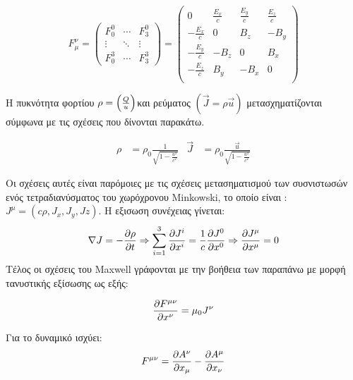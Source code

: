 \[
  F_\mu ^\nu=
  \begin{pmatrix}
    F^0 _0  & \cdots & F^0 _3 \\
    \vdots & \ddots & \vdots \\
    F^3 _0  & \cdots & F^3 _3
  \end{pmatrix}
  =
  \begin{pmatrix}
    0                &\frac{E_x}{c} &\frac{E_y}{c} & \frac{E_z}{c} \\
    -\frac{E_x}{c}   & 0            & B_z          & -B_y \\
    -\frac{E_y}{c}   & -B_z         & 0            & B_x \\
    -\frac{E_z}{c}   & B_y          & -B_x         & 0 \\
  \end{pmatrix} 
\]

Η πυκνότητα φορτίου $\rho = \left(  \frac{Q}{u} \right) $και ρεύματος $(\vec{J}=\rho \vec{u}) $ μετασχηματίζονται σύμφωνα με τις σχέσεις που δίνονται παρακάτω. 

\begin{align}
  \rho &=\rho_0\frac{1}{\sqrt{1-\frac{u^2}{c^2}}}  & \vec{J}& =\rho_0\frac{\vec{u}}{\sqrt{1-\frac{u^2}{c^2}}}
\end{align}

Οι σχέσεις αυτές είναι παρόμοιες με τις σχέσεις μετασηματισμού των συσνιστωσών ενός τετραδιανύσματος του χωρόχρονου Minkowski, το οποίο είναι : $J^{\mu}=(c\rho,J_x,J_y,Jz)$. 
Η εξισωση συνέχειας γίνεται: 
\begin{equation}
  \nabla J = -\frac{\partial \rho}{\partial t} \Rightarrow \sum\limits_{i=1}^3 \frac{\partial J^i}{\partial x^i}=\frac{1}{c}\frac{\partial J^0}{\partial x^0} \Rightarrow \frac{\partial J^{\mu}}{\partial x^{\mu}}=0
  \label{contineq}
\end{equation}
Τέλος οι σχέσεις του \textlatin{Maxwell} γράφονται με την βοήθεια των παραπάνω με μορφή τανυστικής εξίσωσης ως εξής: 

\begin{equation}
  \frac{\partial F^{\mu \nu}}{\partial x^{\nu}}=\mu_0 J^{\nu}
  \label {contineq2}
\end{equation}

Για το δυναμικό ισχύει: 
\[
  F^{\mu \nu}=\frac{\partial A^\nu}{\partial x_{\mu}}-\frac{\partial A^\mu}{\partial x_{\nu}}
\]

  
